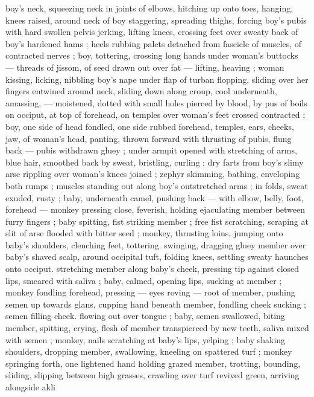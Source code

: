boy's neck, squeezing neck in joints of elbows, hitching up onto 
toes, hanging, knees raised, around neck of boy staggering, 
spreading thighs, forcing boy's pubis with hard swollen pelvis 
jerking, lifting knees, crossing feet over sweaty back of boy's 
hardened hams ; heels rubbing palets detached from fascicle of 
muscles, of contracted nerves ; boy, tottering, crossing long hands 
under woman's buttocks --- threads of jissom, of seed drawn out 
over fat --- lifting, heaving ; woman kissing, licking, nibbling boy's 
nape under flap of turban flopping, sliding over her fingers entwined 
around neck, sliding down along croup, cool underneath, amassing, 
--- moistened, dotted with small holes pierced by blood, by pus of 
boils on occiput, at top of forehead, on temples {\dashcom} over woman's 
feet crossed contracted ; boy, one side of head fondled, one side 
rubbed {\col} forehead, temples, ears, cheeks, jaw, of woman's head, 
panting, thrown forward with thrusting of pubis, flung back --- pubis 
withdrawn gluey ; under armpit opened with stretching of arms, blue 
hair, smoothed back by sweat, bristling, curling ; dry farts from boy's 
slimy arse rippling over woman's knees joined ; zephyr skimming, 
bathing, enveloping both rumps ; muscles standing out along boy's 
outstretched arms ; in folds, sweat exuded, rusty ; baby, underneath 
camel, pushing back --- with elbow, belly, foot, forehead --- monkey 
pressing close, feverish, holding ejaculating member between furry 
fingers ; baby spitting, fist striking member ; free fist scratching, 
scraping at slit of arse flooded with bitter seed ; monkey, thrusting 
loins, jumping onto baby's shoulders, clenching feet, tottering. 
swinging, dragging gluey member over baby's shaved scalp, around 
occipital tuft, folding knees, settling sweaty haunches onto occiput. 
stretching member along baby's cheek, pressing tip against closed 
lips, smeared with saliva ; baby, calmed, opening lips, sucking at 
member ; monkey fondling forehead, pressing --- eyes roving --- 
root of member, pushing semen up towards glans, cupping hand 
beneath member, fondling cheek sucking ; semen filling cheek. 
flowing out over tongue ; baby, semen swallowed, biting member, 
spitting, crying, flesh of member transpierced by new teeth, saliva 
mixed with semen ; monkey, nails scratching at baby's lips, yelping ;
baby shaking shoulders, dropping member, swallowing, kneeling on 
spattered turf ; monkey springing forth, one lightened hand holding 
grazed member, trotting, bounding, sliding, slipping between high 
grasses, crawling over turf revived green, arriving alongside akli 
